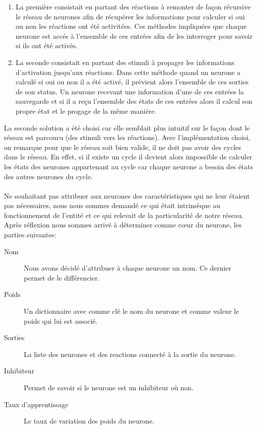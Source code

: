 \begin{enumerate}
  \item La première consistait en partant des réactions à remonter de façon 
    récursive le réseau de neurones afin de récupérer les informations pour 
    calculer si oui ou non les réactions ont été activitées. Ces méthodes impliquées 
    que chaque neurone est accés à l'ensemble de ces entrées afin de les 
    interroger pour savoir si ils ont été activés.
  \item La seconde consistait en partant des stimuli à propager les informations
    d'activation jusqu'aux réactions. Dans cette méthode quand un neurone a calculé
    si oui ou non il a été activé, il prévient alors l'ensemble de ces sorties de
    son status. Un neurone recevant une information d'une de ces entrées la
    sauvegarde et si il a reçu l'ensemble des états de ces entrées alors il calcul
    son propre état et le progage de la même maniére.
\end{enumerate}

La seconde solution a été choisi car elle semblait plus intuitif sur le 
façon dont le réseau est parcouru (des stimuli vers les réactions). Avec
l'implémentation choisi, on remarque pour que le réseau soit bien valide,
il ne doit pas avoir des cycles dans le réseau. En effet, si il existe un
cycle il devient alors impossible de calculer les états des neurones 
appartenant au cycle car chaque neurone a besoin des états des autres neurones du
cycle.

\paragraph{}
Ne souhaitant pas attribuer aux neurones des caractéristiques qui ne leur étaient
pas nécessaires, nous nous sommes demandé ce qui était intrinsèque au
fonctionnement de l'entité et ce qui relevait de la particularité de notre
réseau. Après réflexion nous sommes arrivé à déterminer comme cœur du neurone, les
parties suivantes:\\

\begin{description}
  \item[Nom] Nous avons décidé d'attribuer à chaque neurone un nom. Ce dernier
    permet de le différencier.
  \item[Poids] Un dictionnaire avec comme clé le nom du neurone et comme valeur
    le poids qui lui est associé.
  \item[Sorties] La liste des neurones et des reactions connecté à la sortie
    du neurone.
  \item[Inhibiteur] Permet de savoir si le neurone est un inhibiteur où non.
  \item[Taux d'apprentissage] Le taux de variation des poids du neurone.
\end{description}

\paragraph{}
